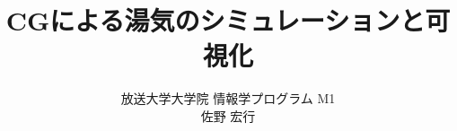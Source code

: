 \usepackage[dvipdfmx]{graphicx}
\usepackage[margin=30mm]{geometry}
\usepackage{url}


\title{CGによる湯気のシミュレーションと可視化}
\author{放送大学大学院 情報学プログラム M1\\ 佐野 宏行}
\maketitle
